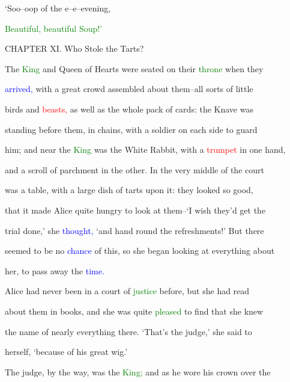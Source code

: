  ‘Soo--oop of the e--e--evening,

 \textcolor{green}{Beautiful,} \textcolor{green}{beautiful} \textcolor{green}{Soup!’}









 CHAPTER XI. Who Stole the Tarts?



 The \textcolor{green}{King} and Queen of Hearts were seated on their \textcolor{green}{throne} when they

 \textcolor{blue}{arrived,} with a great crowd assembled about them--all sorts of little

 birds and \textcolor{red}{beasts,} as well as the whole pack of cards: the Knave was

 standing before them, in chains, with a \textcolor{BurntOrange}{soldier} on each side to \textcolor{BurntOrange}{guard}

 him; and near the \textcolor{green}{King} was the \textcolor{BurntOrange}{White} Rabbit, with a \textcolor{red}{trumpet} in one hand,

 and a scroll of parchment in the other. In the very middle of the \textcolor{BurntOrange}{court}

 was a table, with a large dish of tarts upon it: they looked so \textcolor{BurntOrange}{good,}

 that it made Alice quite \textcolor{BurntOrange}{hungry} to look at them--‘I wish they’d get the

 trial done,’ she \textcolor{blue}{thought,} ‘and hand round the refreshments!’ But there

 seemed to be no \textcolor{blue}{chance} of this, so she began looking at everything about

 her, to pass away the \textcolor{blue}{time.}



 Alice had never been in a \textcolor{BurntOrange}{court} of \textcolor{green}{justice} before, but she had read

 about them in books, and she was quite \textcolor{green}{pleased} to find that she knew

 the name of nearly everything there. ‘That’s the judge,’ she said to

 herself, ‘because of his great wig.’



 The judge, by the way, was the \textcolor{green}{King;} and as he wore his crown over the

